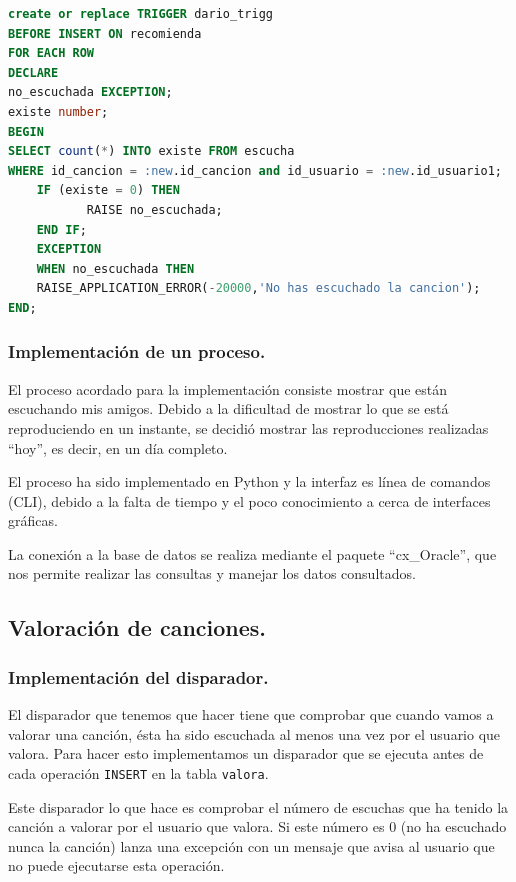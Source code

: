 \documentclass[12pt,a4paper]{article}
\begin{document}
\begin{lstlisting}[language=SQL]
create or replace TRIGGER dario_trigg
BEFORE INSERT ON recomienda
FOR EACH ROW
DECLARE
no_escuchada EXCEPTION;
existe number;
BEGIN
SELECT count(*) INTO existe FROM escucha 
WHERE id_cancion = :new.id_cancion and id_usuario = :new.id_usuario1;
    IF (existe = 0) THEN
           RAISE no_escuchada;
    END IF;
    EXCEPTION
    WHEN no_escuchada THEN
    RAISE_APPLICATION_ERROR(-20000,'No has escuchado la cancion');
END;
\end{lstlisting}
\newpage
\subsubsection{Implementación de un proceso.}
	El proceso acordado para la implementación consiste mostrar que están escuchando mis amigos. Debido a la dificultad de mostrar lo que se está reproduciendo en un instante, se decidió mostrar las reproducciones realizadas ``hoy'', es decir, en un día completo.
	
	El proceso ha sido implementado en Python y la interfaz es línea de comandos (CLI), debido a la falta de tiempo y el poco conocimiento a cerca de interfaces gráficas. 
	
	La conexión a la base de datos se realiza mediante el paquete ``cx\_Oracle'', que nos permite realizar las consultas y manejar los datos consultados.





\subsection{Valoración de canciones.}
\subsubsection{Implementación del disparador.}
El disparador que tenemos que hacer tiene que comprobar que cuando vamos a valorar una canción, ésta ha sido escuchada al menos una vez por el usuario que valora. Para hacer esto implementamos un disparador que se ejecuta antes de cada operación \texttt{INSERT} en la tabla \texttt{valora}.

Este disparador lo que hace es comprobar el número de escuchas que ha tenido la canción a valorar por el usuario que valora. Si este número es 0 (no ha escuchado nunca la canción) lanza una excepción con un mensaje que avisa al usuario que no puede ejecutarse esta operación.
\end{document}
